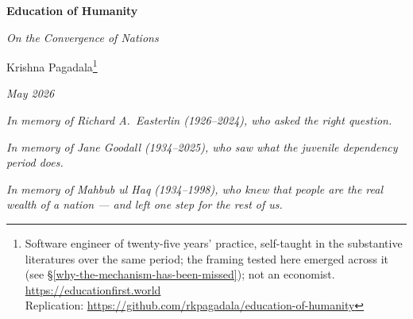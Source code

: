 \documentclass[12pt,letterpaper]{article}
\begin{document}
\begin{titlepage}
\begin{center}
\vspace*{2cm}
{\LARGE\bfseries Education of Humanity\par}
\vspace{0.5cm}
{\large\itshape On the Convergence of Nations\par}
\vspace{1.5cm}
{\large Krishna Pagadala\footnote{Software engineer of twenty-five years' practice, self-taught in the substantive literatures over the same period; the framing tested here emerged across it (see \S\ref{why-the-mechanism-has-been-missed}); not an economist. \url{https://educationfirst.world}\\Replication: \url{https://github.com/rkpagadala/education-of-humanity}}\par}
\vspace{0.5cm}
{\normalsize\itshape May 2026\par}
\vspace{1cm}
{\small\itshape In memory of Richard A.\ Easterlin (1926--2024), who asked the right question.\par}
\vspace{0.5cm}
{\small\itshape In memory of Jane Goodall (1934--2025), who saw what the juvenile dependency period does.\par}
\vspace{0.5cm}
{\small\itshape In memory of Mahbub ul Haq (1934--1998), who knew that people are the real wealth of a nation --- and left one step for the rest of us.\par}
\vspace{1cm}
\end{center}

\begin{abstract}
\noindent Wallace's theory explained how species differentiate under
isolation. This paper documents the inverse: one species, post-1960,
converging across every political system and continent onto a shared
developmental threshold --- TFR below 3.65 and life expectancy above
69.8 (the 1960 United States values). By
2022, 154 countries have crossed. The outcomes tracked under ``human
development'' --- fertility, longevity, offspring survival --- are
the classical fitness components of life-history theory; this
convergence is the event this paper predicts and explains.
Pre-transition local fertility patterns and post-crossing trajectory
dynamics are outside its scope; it addresses the crossing event in
the post-decolonization window and its generational predictor.


\end{abstract}
\end{titlepage}
\end{document}
